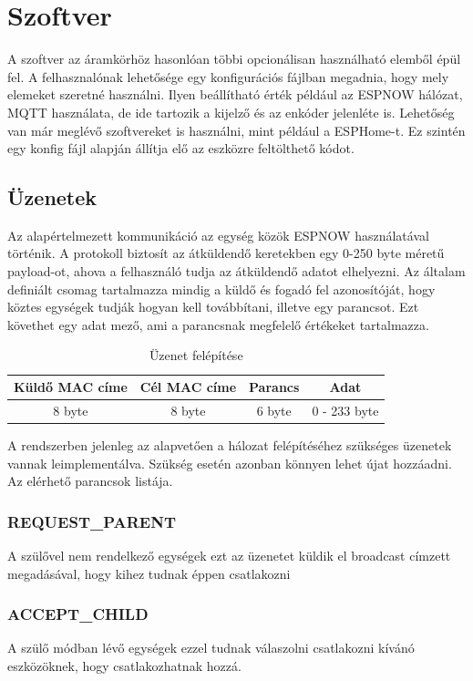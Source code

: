 \section{Szoftver}

A szoftver az áramkörhöz hasonlóan többi opcionálisan használható elemből épül fel. A felhasznalónak lehetősége egy konfigurációs fájlban megadnia, hogy mely elemeket szeretné használni. Ilyen beállítható érték például az ESPNOW hálózat, MQTT használata, de ide tartozik a kijelző és az enkóder jelenléte is. Lehetőség van már meglévő szoftvereket is használni, mint például a ESPHome-t. Ez szintén egy konfig fájl alapján állítja elő az eszközre feltölthető kódot.

\subsection{Üzenetek}
Az alapértelmezett kommunikáció az egység közök ESPNOW használatával történik. A protokoll biztosít az átküldendő keretekben egy 0-250 byte méretű payload-ot, ahova a felhasználó tudja az átküldendő adatot elhelyezni. Az általam definiált csomag tartalmazza mindig a küldő és fogadó fel azonosítóját, hogy köztes egységek tudják hogyan kell továbbítani, illetve egy parancsot. Ezt követhet egy adat mező, ami a parancsnak megfelelő értékeket tartalmazza.

\begin{table}[ht]
	\footnotesize
	\centering
	\begin{tabular}{ | c | c | c | c |}
		\toprule
		Küldő MAC címe & Cél MAC címe & Parancs & Adat \\
		\midrule
        8 byte & 8 byte & 6 byte & 0 - 233 byte \\
	\end{tabular}
	\caption{Üzenet felépítése}
	\label{tab:TabularExample}
\end{table}

A rendszerben jelenleg az alapvetően a hálozat felépítéséhez szükséges üzenetek vannak leimplementálva. Szükség esetén azonban könnyen lehet újat hozzáadni. Az elérhető parancsok listája.

\subsubsection{REQUEST\_PARENT}
A szülővel nem rendelkező egységek ezt az üzenetet küldik el broadcast címzett megadásával, hogy kihez tudnak éppen csatlakozni
\subsubsection{ACCEPT\_CHILD}
A szülő módban lévő egységek ezzel tudnak válaszolni csatlakozni kívánó eszközöknek, hogy csatlakozhatnak hozzá.
